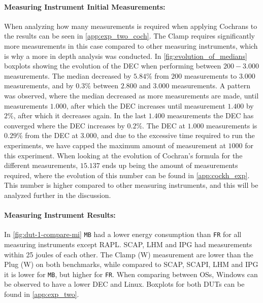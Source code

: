 \paragraph{Measuring Instrument Initial Measurements:} When analyzing how many measurements is required when applying Cochrans to the results can be seen in \cref{app:exp_two_coch}. %
The Clamp requires significantly more measurements in this case compared to other measuring instruments, which is why a more in depth analysis was conducted. In \cref{fig:evolution_of_medians} boxplots showing the evolution of the DEC when performing between $200-3.000$ measurements. The median decreased by $5.84\%$ from $200$ measurements to $3.000$ measurements, and by $0.3\%$ between $2.800$ and $3.000$ measurements. A pattern was observed, where the median decreased as more measurements are made, until measurements $1.000$, after which the DEC increases until measurement $1.400$ by $2\%$, after which it decreases again. In the last $1.400$ measurements the DEC has converged where the DEC increases by $0.2\%$. The DEC at $1.000$ measurements is $0.29\%$ from the DEC at $3.000$, and due to the excessive time required to run the experiments, we have capped the maximum amount of measurement at $1000$ for this experiment. When looking at the evolution of Cochran's formula for the different measurements, $15.137$ ends up being the amount of measurements required, where the evolution of this number can be found in \cref{app:cockh_exp}. This number is higher compared to other measuring instruments, and this will be analyzed further in the discussion.



\paragraph{Measuring Instrument Results:} %
In \cref{fig:dut-1-compare-mi} \texttt{MB} had a lower energy consumption than \texttt{FR} for all measuring instruments except RAPL. SCAP, LHM and IPG had measurements within 25 joules of each other. The Clamp (W) measurement are lower than the Plug (W) on both benchmarks, while compared to SCAP, SCAPI, LHM and IPG it is lower for \texttt{MB}, but higher for \texttt{FR}. When comparing between OSs, Windows can be observed to have a lower DEC and Linux. Boxplots for both DUTs can be found in \cref{app:exp_two}.



